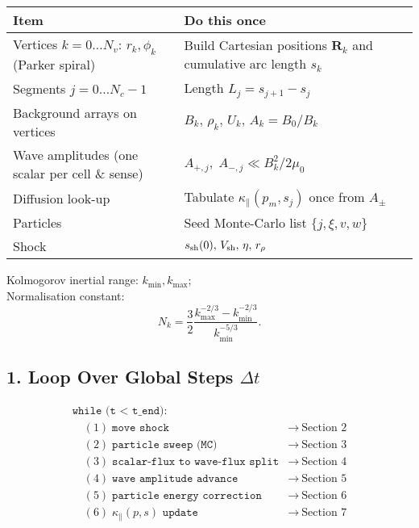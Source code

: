 \begin{table}[h!]
\centering
\begin{tabular}{|p{8cm}|p{6cm}|}
\hline
\textbf{Item} & \textbf{Do this once} \\
\hline
Vertices $k=0\ldots N_v$: $r_k,\phi_k$ (Parker spiral) & Build Cartesian positions $\mathbf{R}_k$ and cumulative arc length $s_k$ \\
Segments $j=0\ldots N_c-1$ & Length $L_j = s_{j+1} - s_j$ \\
Background arrays on vertices & $B_k,\,\rho_k,\,U_k,\,A_k = B_0/B_k$ \\
Wave amplitudes (one scalar per cell \& sense) & $A_{+,j},\;A_{-,j} \ll B_k^2/2\mu_0$ \\
Diffusion look-up & Tabulate $\kappa_\parallel(p_m,s_j)$ once from $A_\pm$ \\
Particles & Seed Monte-Carlo list $\{j, \xi, v, w\}$ \\
Shock & $s_{\rm sh}(0),\,V_{\rm sh},\,\eta,\,r_{\rho}$ \\
\hline
\end{tabular}
\end{table}

Kolmogorov inertial range: $k_{\min},k_{\max}$;\\
Normalisation constant: 
\[
N_k = \frac{3}{2} \frac{k_{\max}^{-2/3} - k_{\min}^{-2/3}}{k_{\min}^{-5/3}}.
\]

\subsection*{1. Loop Over Global Steps $\Delta t$}

\[
\begin{array}{ll}
\texttt{while (t < t\_end):} \\
\quad (1)\; \texttt{move shock}                    & \longrightarrow\ \text{Section 2} \\
\quad (2)\; \texttt{particle sweep (MC)}            & \longrightarrow\ \text{Section 3} \\
\quad (3)\; \texttt{scalar-flux to wave-flux split} & \longrightarrow\ \text{Section 4} \\
\quad (4)\; \texttt{wave amplitude advance}         & \longrightarrow\ \text{Section 5} \\
\quad (5)\; \texttt{particle energy correction}     & \longrightarrow\ \text{Section 6} \\
\quad (6)\; \texttt{$\kappa_{\parallel}(p,s)$ update} & \longrightarrow\ \text{Section 7}
\end{array}
\]

